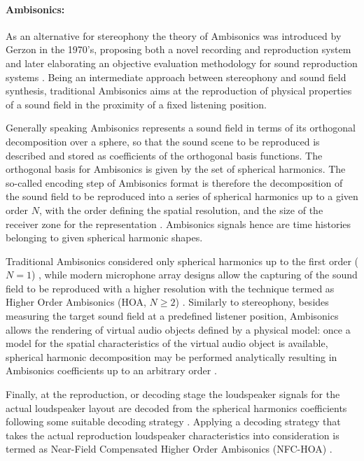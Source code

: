 \paragraph{Ambisonics:}
As an alternative for stereophony the theory of Ambisonics was introduced by Gerzon in the 1970's, proposing both a novel recording and reproduction system \cite{gerzon1973periphony} and later elaborating an objective evaluation methodology for sound reproduction systems \cite{gerzon1992general}.
Being an intermediate approach between stereophony and sound field synthesis, traditional Ambisonics aims at the reproduction of physical properties of a sound field in the proximity of a fixed listening position.

Generally speaking Ambisonics represents a sound field in terms of its orthogonal decomposition over a sphere, so that the sound scene to be reproduced is described and stored as coefficients of the orthogonal basis functions.
The orthogonal basis for Ambisonics is given by the set of spherical harmonics.
The so-called encoding step of Ambisonics format is therefore the decomposition of the sound field to be reproduced into a series of spherical harmonics up to a given order $N$, with the order defining the spatial resolution, and the size of the receiver zone for the representation \cite{gerzon1985ambisonics}.
Ambisonics signals hence are time histories belonging to given spherical harmonic shapes.

Traditional Ambisonics considered only spherical harmonics up to the first order ($N = 1$) \cite{gerzon1975the}, while modern microphone array designs allow the capturing of the sound field to be reproduced with a higher resolution with the technique termed as Higher Order Ambisonics (HOA, $N \geq 2$) \cite{5745011, 5744968, 5356221}.
Similarly to stereophony, besides measuring the target sound field at a predefined listener position, Ambisonics allows the rendering of virtual audio objects defined by a physical model:
once a model for the spatial characteristics of the virtual audio object is available, spherical harmonic decomposition may be performed analytically resulting in Ambisonics coefficients up to an arbitrary order \cite{4517624, Ahrens2010phd}.

Finally, at the reproduction, or decoding stage the loudspeaker signals for the actual loudspeaker layout are decoded from the spherical harmonics coefficients following some suitable decoding strategy \cite{Daniel2000:phd, Daniel2003b, zotter:hal-01106738, zotter2012all}.
Applying a decoding strategy that takes the actual reproduction loudspeaker characteristics into consideration is termed as Near-Field Compensated Higher Order Ambisonics (NFC-HOA) \cite{Daniel2003}.

